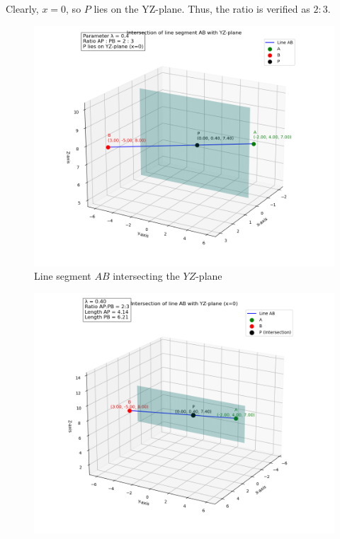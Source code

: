 \documentclass[journal]{IEEEtran}
\begin{document}
Clearly, $x=0$, so $P$ lies on the YZ-plane.  
Thus, the ratio is verified as $2:3$.




\begin{figure}[h]
    \centering
    \includegraphics[width=0.9\columnwidth]{figs/fig_61.png}
    \caption{Line segment $AB$ intersecting the $YZ$-plane}
\end{figure}
\begin{figure}
    \centering
    \includegraphics[width=0.9\columnwidth]{figs/Fig -62.png}
    \caption{}
    \label{fig:placeholder}
\end{figure}
\end{document}
